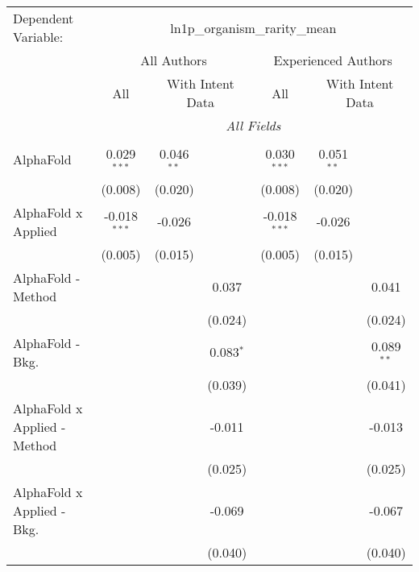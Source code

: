 \begingroup
\centering
\begin{tabular}{lcccccc}
   \tabularnewline \midrule \midrule
   Dependent Variable: & \multicolumn{6}{c}{ln1p\_organism\_rarity\_mean}\\
 & \multicolumn{3}{c}{All Authors} & \multicolumn{3}{c}{Experienced Authors} \\
\cmidrule(lr){2-4} \cmidrule(lr){5-7}
 & \multicolumn{1}{c}{All} & \multicolumn{2}{c}{With Intent Data} & \multicolumn{1}{c}{All} & \multicolumn{2}{c}{With Intent Data} \\
\cmidrule(lr){2-2} \cmidrule(lr){3-4} \cmidrule(lr){5-5} \cmidrule(lr){6-7}
 & \multicolumn{6}{c}{\textit{All Fields}} \\ \\
   AlphaFold                      & 0.029$^{***}$  & 0.046$^{**}$ &             & 0.030$^{***}$  & 0.051$^{**}$ &   \\   
                                  & (0.008)        & (0.020)      &             & (0.008)        & (0.020)      &   \\   
   AlphaFold x Applied            & -0.018$^{***}$ & -0.026       &             & -0.018$^{***}$ & -0.026       &   \\   
                                  & (0.005)        & (0.015)      &             & (0.005)        & (0.015)      &   \\   
   AlphaFold - Method             &                &              & 0.037       &                &              & 0.041\\   
                                  &                &              & (0.024)     &                &              & (0.024)\\   
   AlphaFold - Bkg.               &                &              & 0.083$^{*}$ &                &              & 0.089$^{**}$\\   
                                  &                &              & (0.039)     &                &              & (0.041)\\   
   AlphaFold x Applied - Method   &                &              & -0.011      &                &              & -0.013\\   
                                  &                &              & (0.025)     &                &              & (0.025)\\   
   AlphaFold x Applied - Bkg.     &                &              & -0.069      &                &              & -0.067\\   
                                  &                &              & (0.040)     &                &              & (0.040)\\   

\end{tabular}
